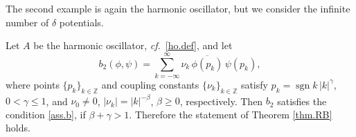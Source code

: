 The second example is again the harmonic oscillator, but we consider the infinite number of $\delta$ potentials.
\begin{example}
Let $A$ be the harmonic oscillator, {\emph{cf.}}~\eqref{ho.def}, and let 
\begin{equation}
b_2(\phi,\psi) = \sum_{k =-\infty}^{\infty} \nu_k \, \overline{\phi(p_k)} \, \psi(p_k),
\end{equation}
where points $\{p_k\}_{k \in {{\mathbb{Z}}}}$ and coupling constants $\{\nu_k\}_{k\in {{\mathbb{Z}}}}$ satisfy $p_k ={\operatorname{sgn}} k \, |k|^{\gamma}$, $0< \gamma \leq 1$, and $\nu_0 \neq 0$, $|\nu_k| = |k|^{-\beta}$, $\beta \geq 0$, respectively. Then $b_2$ satisfies the condition \eqref{ass.b}, if $\beta + \gamma >1$.
Therefore the statement of Theorem \ref{thm.RB} holds.
\end{example}
